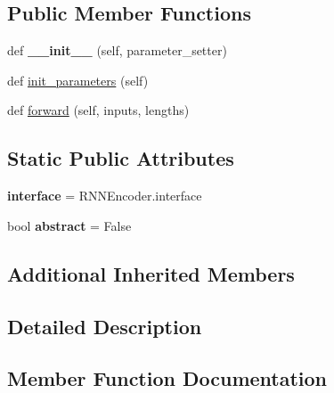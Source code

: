\subsection*{Public Member Functions}
\begin{DoxyCompactItemize}
\item 
def {\bfseries \+\_\+\+\_\+init\+\_\+\+\_\+} (self, parameter\+\_\+setter)\hypertarget{classrnn_1_1BidirectionalRNNEncoder_acf8de7a3fa694e7f17c129472db6beca}{}\label{classrnn_1_1BidirectionalRNNEncoder_acf8de7a3fa694e7f17c129472db6beca}

\item 
def \hyperlink{classrnn_1_1BidirectionalRNNEncoder_a038860b36d2869ad536345ba054e8cee}{init\+\_\+parameters} (self)
\item 
def \hyperlink{classrnn_1_1BidirectionalRNNEncoder_a32673b75f9536ce891018073f6467fd4}{forward} (self, inputs, lengths)
\end{DoxyCompactItemize}
\subsection*{Static Public Attributes}
\begin{DoxyCompactItemize}
\item 
{\bfseries interface} = R\+N\+N\+Encoder.\+interface\hypertarget{classrnn_1_1BidirectionalRNNEncoder_aad07c0c8c5211291502c242263f8f766}{}\label{classrnn_1_1BidirectionalRNNEncoder_aad07c0c8c5211291502c242263f8f766}

\item 
bool {\bfseries abstract} = False\hypertarget{classrnn_1_1BidirectionalRNNEncoder_a58c145d0b71eb6bf19517e51965599f0}{}\label{classrnn_1_1BidirectionalRNNEncoder_a58c145d0b71eb6bf19517e51965599f0}

\end{DoxyCompactItemize}
\subsection*{Additional Inherited Members}


\subsection{Detailed Description}
\begin{DoxyVerb}\end{DoxyVerb}
 

\subsection{Member Function Documentation}
